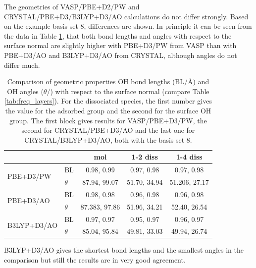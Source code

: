\documentclass[11pt,DIV=13,BCOR=5mm,a4paper,headinclude]{scrbook}
\begin{document}
 
The geometries of VASP/PBE+D2/PW and CRYSTAL/PBE+D3/B3LYP+D3/AO calculations do not differ strongly.
Based on the example basis set 8, differences are shown.
In principle it can be seen from the data in Table \ref{tab:geom_comp_vasp-crystal}, that both bond lengths and angles with respect to the surface normal are slightly higher with PBE+D3/PW from VASP than with PBE+D3/AO and B3LYP+D3/AO from CRYSTAL, although angles do not differ much.
\begin{table}[!h]
  \centering
   \caption{Comparison of geometric properties OH bond lengths (BL/\AA{}) and OH angles ($\theta$/\textdegree) with respect to the surface normal (compare Table \ref{tab:freq_layers}).
For the dissociated species, the first number gives the value for the adsorbed group and the second for the surface OH group.
The first block gives results for VASP/PBE+D3/PW, the second for CRYSTAL/PBE+D3/AO and the last one for CRYSTAL/B3LYP+D3/AO, both with the basis set 8.}
  \begin{tabular}{ll|ccc}
  \toprule
   &&mol & 1-2 diss & 1-4 diss \\\midrule
\multirow{2}{*}{PBE+D3/PW} &BL &0.98, 0.99 &0.97, 0.98 &0.97, 0.98 \\
&$\theta$ &87.94, 99.07 &51.70, 34.94 &51.206, 27.17 \\\midrule
\multirow{2}{*}{PBE+D3/AO}&BL &0.98, 0.98 &0.96, 0.98 &0.96, 0.98 \\
&$\theta$ &87.383, 97.86 &51.96, 34.21 &52.40, 26.54 \\\midrule
\multirow{2}{*}{B3LYP+D3/AO}& BL &0.97, 0.97 &0.95, 0.97 &0.96, 0.97 \\
&$\theta$ &85.04, 95.84 &49.81, 33.03 &49.94, 26.74 \\\bottomrule
  \end{tabular}
  \label{tab:geom_comp_vasp-crystal}
\end{table}
B3LYP+D3/AO gives the shortest bond lengths and the smallest angles in the comparison but still the results are in very good agreement.
\end{document}
